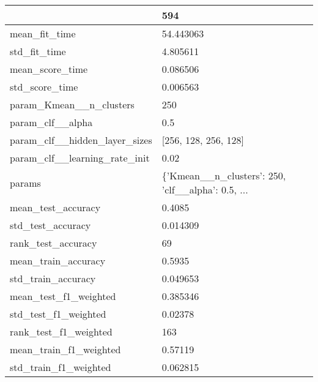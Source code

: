\begin{tabular}{ll}
\toprule
{} &                                                594 \\
\midrule
mean\_fit\_time                 &                                          54.443063 \\
std\_fit\_time                  &                                           4.805611 \\
mean\_score\_time               &                                           0.086506 \\
std\_score\_time                &                                           0.006563 \\
param\_Kmean\_\_n\_clusters       &                                                250 \\
param\_clf\_\_alpha              &                                                0.5 \\
param\_clf\_\_hidden\_layer\_sizes &                               [256, 128, 256, 128] \\
param\_clf\_\_learning\_rate\_init &                                               0.02 \\
params                        &  \{'Kmean\_\_n\_clusters': 250, 'clf\_\_alpha': 0.5, ... \\
mean\_test\_accuracy            &                                             0.4085 \\
std\_test\_accuracy             &                                           0.014309 \\
rank\_test\_accuracy            &                                                 69 \\
mean\_train\_accuracy           &                                             0.5935 \\
std\_train\_accuracy            &                                           0.049653 \\
mean\_test\_f1\_weighted         &                                           0.385346 \\
std\_test\_f1\_weighted          &                                            0.02378 \\
rank\_test\_f1\_weighted         &                                                163 \\
mean\_train\_f1\_weighted        &                                            0.57119 \\
std\_train\_f1\_weighted         &                                           0.062815 \\

\end{tabular}
